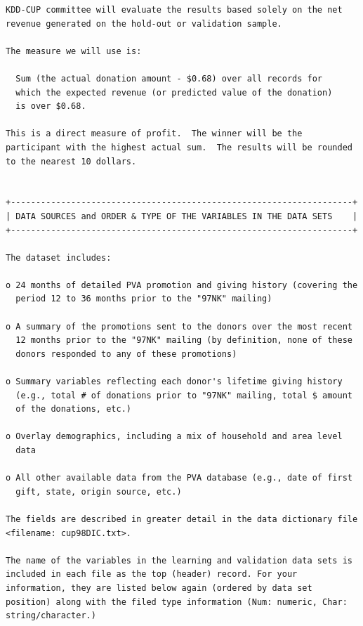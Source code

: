 \documentclass[
  11pt,
  a4paper,
  DIV=12,captions=tableheading,oneside,titlepage]{scrbook}
\begin{document}
\begin{verbatim}
KDD-CUP committee will evaluate the results based solely on the net
revenue generated on the hold-out or validation sample.

The measure we will use is:

  Sum (the actual donation amount - $0.68) over all records for 
  which the expected revenue (or predicted value of the donation) 
  is over $0.68.

This is a direct measure of profit.  The winner will be the 
participant with the highest actual sum.  The results will be rounded 
to the nearest 10 dollars. 


+--------------------------------------------------------------------+
| DATA SOURCES and ORDER & TYPE OF THE VARIABLES IN THE DATA SETS    |
+--------------------------------------------------------------------+

The dataset includes:

o 24 months of detailed PVA promotion and giving history (covering the
  period 12 to 36 months prior to the "97NK" mailing)

o A summary of the promotions sent to the donors over the most recent
  12 months prior to the "97NK" mailing (by definition, none of these
  donors responded to any of these promotions)

o Summary variables reflecting each donor's lifetime giving history
  (e.g., total # of donations prior to "97NK" mailing, total $ amount
  of the donations, etc.)

o Overlay demographics, including a mix of household and area level
  data

o All other available data from the PVA database (e.g., date of first
  gift, state, origin source, etc.)

The fields are described in greater detail in the data dictionary file
<filename: cup98DIC.txt>.

The name of the variables in the learning and validation data sets is
included in each file as the top (header) record. For your
information, they are listed below again (ordered by data set
position) along with the filed type information (Num: numeric, Char:
string/character.)


\end{verbatim}
\end{document}
